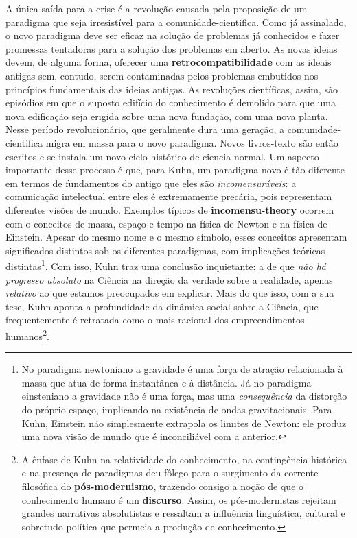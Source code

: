 \documentclass[./main.tex]{subfiles}
\begin{document}
\par A única saída para a crise é a revolução causada pela proposição de um \gls{paradigma} que seja irresistível para a \gls{comunidade-cientifica}. Como já assinalado, o novo \gls{paradigma} deve ser eficaz na solução de problemas já conhecidos e fazer promessas tentadoras para a solução dos problemas em aberto. As novas ideias devem, de alguma forma, oferecer uma \textbf{retrocompatibilidade} com as ideais antigas sem, contudo, serem contaminadas pelos problemas embutidos nos princípios fundamentais das ideias antigas. As revoluções científicas, assim, são episódios em que o suposto edifício do conhecimento é demolido para que uma nova edificação seja erigida sobre uma nova fundação, com uma nova planta. Nesse período revolucionário, que geralmente dura uma geração, a \gls{comunidade-cientifica} migra em massa para o novo \gls{paradigma}. Novos livros-texto são então escritos e se instala um novo ciclo histórico de \gls{ciencia-normal}. Um aspecto importante desse processo é que, para Kuhn, um \gls{paradigma} novo é tão diferente em termos de fundamentos do antigo que eles são \textit{incomensuráveis}: a comunicação intelectual entre eles é extremamente precária, pois representam diferentes visões de mundo. Exemplos típicos de \textbf{\gls{incomensu-theory}} ocorrem com o conceitos de massa, espaço e tempo na física de Newton e na física de Einstein. Apesar do mesmo nome e o mesmo símbolo, esses conceitos apresentam significados distintos sob os diferentes paradigmas, com implicações teóricas distintas\footnote{No \gls{paradigma} newtoniano a gravidade é uma força de atração relacionada à massa que atua de forma instantânea e à distância. Já no \gls{paradigma} einsteniano a gravidade não é uma força, mas uma \textit{consequência} da distorção do próprio espaço, implicando na existência de ondas gravitacionais. Para Kuhn, Einstein não simplesmente extrapola os limites de Newton: ele produz uma nova visão de mundo que é inconciliável com a anterior.}. Com isso, Kuhn traz uma conclusão inquietante: a de que \textit{não há progresso absoluto} na Ciência na direção da verdade sobre a realidade, apenas \textit{relativo} ao que estamos preocupados em explicar. Mais do que isso, com a sua tese, Kuhn aponta a profundidade da dinâmica social sobre a Ciência, que frequentemente é retratada como o mais racional dos empreendimentos humanos\footnote{A ênfase de Kuhn na relatividade do conhecimento, na contingência histórica e na presença de paradigmas deu fôlego para o surgimento da corrente filosófica do \textbf{pós-modernismo}, trazendo consigo a noção de que o conhecimento humano é um \textbf{discurso}. Assim, os pós-modernistas rejeitam grandes narrativas absolutistas e ressaltam a influência linguística, cultural e sobretudo política que permeia a produção de conhecimento.}.
\end{document}
